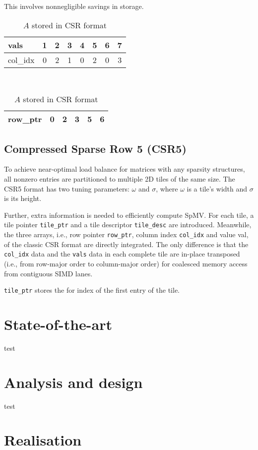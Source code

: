 \documentclass[thesis=M,english]{FITthesis}[2019/12/23]
\begin{document}
This involves nonnegligible savings in storage.

\begin{table}[h!]
	\centering
	\begin{tabular}{ |l||c|c|c|c|c|c|c| }
		\hline
		vals     & 1 & 2 & 3 & 4 & 5 & 6 & 7 \\
		\hline
		col\_idx & 0 & 2 & 1 & 0 & 2 & 0 & 3 \\
		\hline
	\end{tabular} \\
	\begin{tabular}{ |l||c|c|c|c|c| }
		\hline
		row\_ptr & 0 & 2 & 3 & 5 & 6 \\
		\hline
	\end{tabular}
	\caption{$A$ stored in CSR format}
\end{table}

\section{Compressed Sparse Row 5 (CSR5)}

To achieve near-optimal load balance for matrices with any sparsity structures,
all nonzero entries are partitioned to multiple 2D tiles of the same size.
The CSR5 format has two tuning parameters: $\omega$ and $\sigma$, where $\omega$
is a tile’s width and $\sigma$ is its height. \cite{liu2015csr5}

Further, extra information is needed to efficiently compute
SpMV. For each tile, a tile pointer \lstinline!tile_ptr! and a tile descriptor \lstinline!tile_desc! are introduced. 
Meanwhile, the three arrays, i.e., row pointer \lstinline!row_ptr!, column index \lstinline!col_idx! and value val, 
of the classic CSR format are directly integrated. The only difference is that the \lstinline!col_idx! data and the \lstinline!vals!
data in each complete tile are in-place transposed (i.e., from row-major order to column-major order) for coalesced memory access from contiguous SIMD lanes.

\lstinline!tile_ptr! stores the for index of the first entry of the tile.

\chapter{State-of-the-art}
test
\chapter{Analysis and design}
test
\chapter{Realisation}
\end{document}
